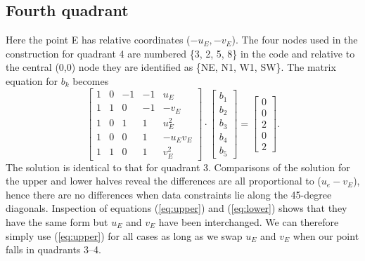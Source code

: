 \documentclass[12pt,letterpaper,margin=0.5in]{article}
\begin{document}
\subsection{Fourth quadrant}
Here the point E has relative coordinates ($-u_E, -v_E$).  The four nodes used in the
construction for quadrant 4 are numbered \{3, 2, 5, 8\} in the code and relative to the central (0,0) node they
are identified as \{NE, N1, W1, SW\}. The matrix equation for $b_k$ becomes
\begin{equation}
\left[ {\begin{array}{*{20}{r}}
1&0&{ - 1}&{ - 1}&{{u_E}}\\
1&1&0&{ - 1}&{ - {v_E}}\\
1&0&1&1&{u_E^2}\\
1&0&0&1&{ - {u_E}{v_E}}\\
1&1&0&1&{v_E^2}
\end{array}} \right] \cdot \left[ {\begin{array}{*{20}{c}}
{{b_1}}\\
{{b_2}}\\
{{b_3}}\\
{{b_4}}\\
{{b_5}}
\end{array}} \right] = \left[ {\begin{array}{*{20}{c}}
0\\
0\\
2\\
0\\
2
\end{array}} \right].
\end{equation}
The solution is identical to that for quadrant 3.
Comparisons of the solution for the upper and lower halves reveal the differences are all proportional to
($u_e - v_E$), hence there are no differences when data constraints lie along the 45-degree diagonals.
Inspection of equations (\ref{eq:upper}) and (\ref{eq:lower}) shows that they have the same form
but $u_E$ and $v_E$ have been interchanged.  We can therefore simply use (\ref{eq:upper}) for all cases
as long as we swap $u_E$ and $v_E$ when our point falls in quadrants 3--4.
\end{document}
